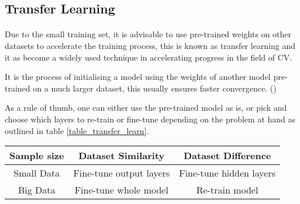 \subsection{Transfer Learning} \label{transfer_learning}
\paragraph{}
Due to the small training set, it is advisable to use pre-trained weights on other datasets to accelerate the training process, this is known as transfer learning and it as become a widely used technique in accelerating progress in the field of \gls{CV}.

It is the process of initialising a model using the weights of another model pre-trained on a much larger dataset, this usually ensures faster convergence. (\cite{shanmugamani2018deep})

As a rule of thumb, one can either use the pre-trained model as is, or pick and choose which layers to re-train or fine-tune depending on the problem at hand as outlined in table \ref{table_transfer_learn}.

\begin{center}
    \begin{tabular}{c|c|c}     \label{table_transfer_learn}
    \textbf{Sample size} & \textbf{Dataset Similarity} & \textbf{Dataset Difference} \\
    \hline
    Small Data 
    &  Fine-tune output layers
    & Fine-tune hidden layers  \\
    \hline
    Big Data 
    &  Fine-tune whole model
    & Re-train model  \\
    \end{tabular}
\end{center}
